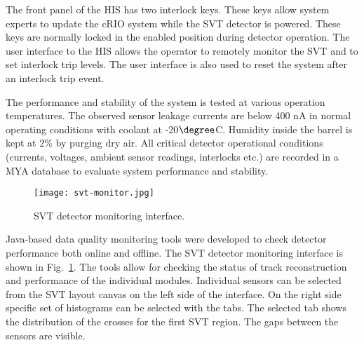 The front panel of the HIS has two interlock keys. These keys allow system experts to update the cRIO system while the SVT detector is powered. These keys are normally locked in the enabled position during detector operation.
The user interface to the HIS allows the operator to remotely monitor the SVT and to set interlock trip levels. The user interface is also used to reset the system after an interlock trip event. 


The performance and stability of the system is tested at various operation temperatures. The observed sensor leakage currents are below 400 nA in normal operating conditions with coolant at -20$\degree$C. Humidity inside the barrel is kept at $2\%$ by purging dry air. All critical detector operational conditions (currents, voltages, ambient sensor readings, interlocks etc.) are recorded in a MYA database \cite{MYA} to evaluate system performance and stability. %

\begin{figure}[hbt] 
\centering 
\texttt{[image: svt-monitor.jpg]}
\caption{SVT detector monitoring interface.}
\label{fig:svt-monitor}
\end{figure}

Java-based data quality monitoring tools were developed to check detector performance both online and offline. The SVT detector monitoring interface is shown in Fig.~\ref{fig:svt-monitor}. The tools allow for checking the status of track reconstruction and performance of the individual modules. Individual sensors can be selected from the SVT layout canvas on the left side of the interface. On the right side specific set of histograms can be selected with the tabs. The selected tab shows the distribution of the crosses for the first SVT region. The gaps between the sensors are visible.

